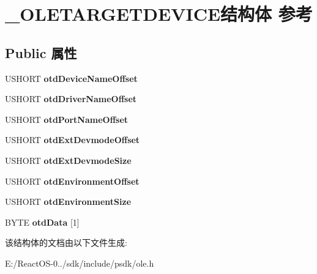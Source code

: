 \hypertarget{struct___o_l_e_t_a_r_g_e_t_d_e_v_i_c_e}{}\section{\+\_\+\+O\+L\+E\+T\+A\+R\+G\+E\+T\+D\+E\+V\+I\+C\+E结构体 参考}
\label{struct___o_l_e_t_a_r_g_e_t_d_e_v_i_c_e}
\subsection*{Public 属性}
\begin{DoxyCompactItemize}
\item 
\mbox{\label{struct___o_l_e_t_a_r_g_e_t_d_e_v_i_c_e_ada8cc9cf1d45835ae0d391a3800d6e2a}} 
U\+S\+H\+O\+RT {\bfseries otd\+Device\+Name\+Offset}
\item 
\mbox{\label{struct___o_l_e_t_a_r_g_e_t_d_e_v_i_c_e_a908f5189b0e67ef1010bd513ae65424c}} 
U\+S\+H\+O\+RT {\bfseries otd\+Driver\+Name\+Offset}
\item 
\mbox{\label{struct___o_l_e_t_a_r_g_e_t_d_e_v_i_c_e_afe29b3860c02f23784f2718e9384df21}} 
U\+S\+H\+O\+RT {\bfseries otd\+Port\+Name\+Offset}
\item 
\mbox{\label{struct___o_l_e_t_a_r_g_e_t_d_e_v_i_c_e_aa7a9e97ef8b885b50a63abf4d61bb886}} 
U\+S\+H\+O\+RT {\bfseries otd\+Ext\+Devmode\+Offset}
\item 
\mbox{\label{struct___o_l_e_t_a_r_g_e_t_d_e_v_i_c_e_a8369eabd0a7769f760202c25dfc9a7e5}} 
U\+S\+H\+O\+RT {\bfseries otd\+Ext\+Devmode\+Size}
\item 
\mbox{\label{struct___o_l_e_t_a_r_g_e_t_d_e_v_i_c_e_ab95d64961f437376a549d1a18ef2a174}} 
U\+S\+H\+O\+RT {\bfseries otd\+Environment\+Offset}
\item 
\mbox{\label{struct___o_l_e_t_a_r_g_e_t_d_e_v_i_c_e_a7cff4fa371b1939b733a3386a79aa305}} 
U\+S\+H\+O\+RT {\bfseries otd\+Environment\+Size}
\item 
\mbox{\label{struct___o_l_e_t_a_r_g_e_t_d_e_v_i_c_e_aa2bba24f05caad81b37f448c81a17e22}} 
B\+Y\+TE {\bfseries otd\+Data} \mbox{[}1\mbox{]}
\end{DoxyCompactItemize}


该结构体的文档由以下文件生成\+:\begin{DoxyCompactItemize}
\item 
E\+:/\+React\+O\+S-\/0../sdk/include/psdk/ole.\+h\end{DoxyCompactItemize}
